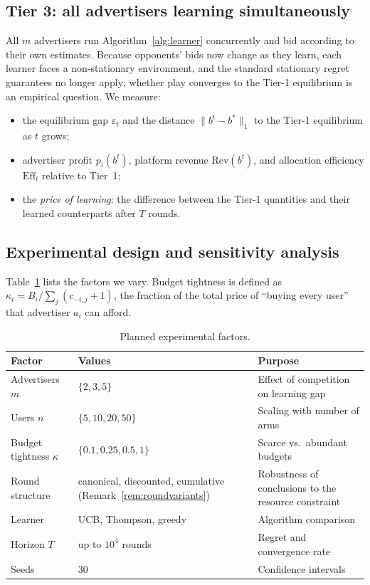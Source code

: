 \documentclass{article}
\theoremstyle{definition}
\theoremstyle{remark}
\begin{document}
\subsection{Tier 3: all advertisers learning simultaneously}
All $m$ advertisers run Algorithm~\ref{alg:learner} concurrently and bid according to their own estimates. Because opponents' bids now change as they learn, each learner faces a non-stationary environment, and the standard stationary regret guarantees no longer apply; whether play converges to the Tier-1 equilibrium is an empirical question. We measure:
\begin{itemize}[leftmargin=*]
  \item the equilibrium gap $\varepsilon_t$ and the distance $\|b^t-b^\ast\|_1$ to the Tier-1 equilibrium as $t$ grows;
  \item advertiser profit $p_i(b^t)$, platform revenue $\mathrm{Rev}(b^t)$, and allocation efficiency $\mathrm{Eff}_t$ relative to Tier~1;
  \item the \emph{price of learning}: the difference between the Tier-1 quantities and their learned counterparts after $T$ rounds.
\end{itemize}

\subsection{Experimental design and sensitivity analysis}
Table~\ref{tab:design} lists the factors we vary. Budget tightness is defined as $\kappa_i=B_i/\sum_j(c_{-i,j}+1)$, the fraction of the total price of ``buying every user'' that advertiser $a_i$ can afford.

\begin{table}[h]
  \caption{Planned experimental factors.}
  \centering
  \begin{tabular}{@{}lll@{}}
    \toprule
    Factor & Values & Purpose \\
    \midrule
    Advertisers $m$ & $\{2,3,5\}$ & Effect of competition on learning gap \\
    Users $n$ & $\{5,10,20,50\}$ & Scaling with number of arms \\
    Budget tightness $\kappa$ & $\{0.1,0.25,0.5,1\}$ & Scarce vs.\ abundant budgets \\
    Round structure & canonical, discounted, cumulative (Remark~\ref{rem:roundvariants}) & Robustness of conclusions to the resource constraint \\
    Learner & UCB, Thompson, greedy & Algorithm comparison \\
    Horizon $T$ & up to $10^4$ rounds & Regret and convergence rate \\
    Seeds & 30 & Confidence intervals \\
    \bottomrule
  \end{tabular}
  \label{tab:design}
\end{table}
\end{document}
